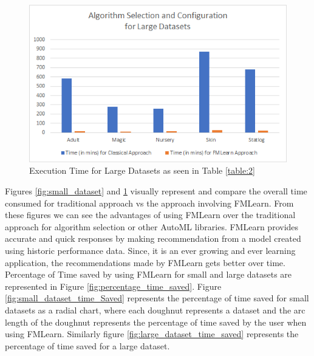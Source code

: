 \begin{figure}[H]
    \centering
    \includegraphics[width=15cm]{images/Large Datasets.png}
    \caption{Execution Time for Large Datasets as seen in Table \ref{table:2}}
    \label{fig:large_dataset}
\end{figure}

\newpage

Figures \ref{fig:small_dataset} and \ref{fig:large_dataset} visually represent and compare the overall time consumed for traditional approach vs the approach involving FMLearn. From these figures we can see the advantages of using FMLearn over the traditional approach for algorithm selection or other AutoML libraries. FMLearn provides accurate and quick responses by making recommendation from a model created using historic performance data. Since, it is an ever growing and ever learning application, the recommendations made by FMLearn gets better over time. Percentage of Time saved by using FMLearn for small and large datasets are represented in Figure \ref{fig:percentage_time_saved}. Figure \ref{fig:small_dataset_time_Saved} represents the percentage of time saved for small datasets as a radial chart, where each doughnut represents a dataset and the arc length of the doughnut represents the percentage of time saved by the user when using FMLearn. Similarly figure \ref{fig:large_dataset_time_saved} represents the percentage of time saved for a large dataset.


